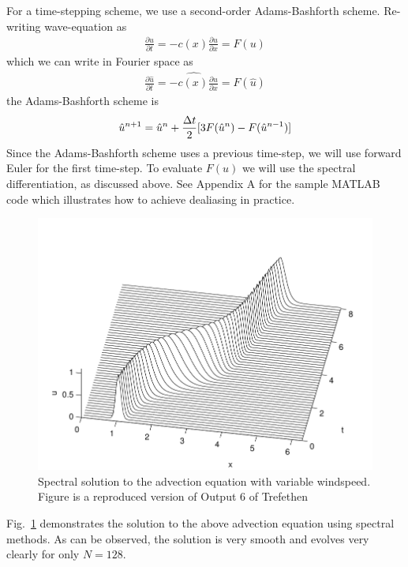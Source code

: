 For a time-stepping scheme, we use a second-order Adams-Bashforth\cite{durran} scheme. Re-writing wave-equation as
\begin{align}
\frac{\partial u}{\partial t} = -c(x)\frac{\partial u}{\partial x} = F(u)
\end{align}
which we can write in Fourier space as
\begin{align}
\frac{\partial \hat{u}}{\partial t} = \widehat{-c(x)\frac{\partial u}{\partial x}} = F(\hat{u})
\end{align}
the Adams-Bashforth scheme is
\begin{align}
\hat{u}^{n+1} = \hat{u}^{n} + \frac{\Delta t}{2}[3F(\hat{u}^{n})-F(\hat{u}^{n-1})]
\end{align}
Since the Adams-Bashforth scheme uses a previous time-step, we will use forward Euler for the first time-step. To evaluate $F(u)$ we will use the spectral differentiation, as discussed above. See Appendix A for the sample MATLAB code which illustrates how to achieve dealiasing in practice. 

\begin{figure}
\begin{center}
\includegraphics[width=\textwidth]{spectral_example.pdf}
\caption{Spectral solution to the advection equation with variable windspeed. Figure is a reproduced version of Output 6 of Trefethen \cite{trefethen_spectral}}
\label{spectral_example}
\end{center}
\end{figure}
Fig.~\ref{spectral_example} demonstrates the solution to the above advection equation using spectral methods. As can be observed, the solution is very smooth and evolves very clearly for only $N=128$.

